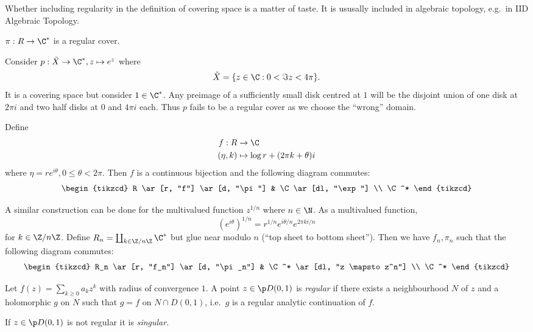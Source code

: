 \documentclass[a4paper]{article}
\begin{document}
\begin{note}
  Whether including regularity in the definition of covering space is a matter of taste. It is ususally included in algebraic topology, e.g.\ in IID Algebraic Topology.
\end{note}

\begin{remark}
  \(\pi: R \to \C^*\) is a regular cover.
\end{remark}

\begin{eg}
  Consider \(p: \tilde X \to \C^*, z \mapsto e^z\) where
  \[
    \tilde X = \{z \in \C: 0 < \Im z < 4\pi\}.
  \]
  It is a covering space but consider \(1 \in \C^*\). Any preimage of a sufficiently small disk centred at \(1\) will be the disjoint union of one disk at \(2\pi i\) and two half disks at \(0\) and \(4\pi i\) each. Thus \(p\) fails to be a regular cover as we choose the ``wrong'' domain.
\end{eg}

Define
\begin{align*}
  f: R &\to \C \\
  (\eta, k) &\mapsto \log r + (2\pi k + \theta) i
\end{align*}
where \(\eta = re^{i\theta}, 0 \leq \theta < 2\pi\). Then \(f\) is a continuous bijection and the following diagram commutes:
\[
  \begin{tikzcd}
    R \ar[r, "f"] \ar[d, "\pi"] & \C \ar[dl, "\exp"] \\
    \C^*
  \end{tikzcd}
\]

A similar construction can be done for the multivalued function \(z^{1/n}\) where \(n \in \N\). As a multivalued function,
\[
  (e^{i\theta})^{1/n} = r^{1/n} e^{i\theta/n} e^{2\pi ki/n}
\]
for \(k \in \Z/n\Z\). Define \(R_n = \coprod_{k \in \Z/n\Z} \C^*\) but glue near modulo \(n\) (``top sheet to bottom sheet''). Then we have \(f_n, \pi_n\) such that the following diagram commutes:
\[
  \begin{tikzcd}
    R_n \ar[r, "f_n"] \ar[d, "\pi_n"] & \C^* \ar[dl, "z \mapsto z^n"] \\
    \C^*
  \end{tikzcd}
\]

\begin{definition}
  Let \(f(z) = \sum_{k \geq 0} a_k z^k\) with radius of convergence \(1\). A point \(z \in \p D(0, 1)\) is \emph{regular} if there exists a neighbourhood \(N\) of \(z\) and a holomorphic \(g\) on \(N\) such that \(g = f\) on \(N \cap D(0, 1)\), i.e.\ \(g\) is a regular analytic continuation of \(f\).

  If \(z \in \p D(0, 1)\) is not regular it is \emph{singular}.
\end{definition}
\end{document}
